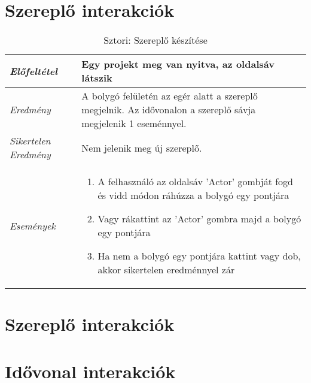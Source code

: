 \section{Szereplő interakciók}

\begin{table}[H]
	\centering
	\begin{tabular}{ | m{} | m{} | }
		\hline
		\emph{Előfeltétel} & Egy projekt meg van nyitva, az oldalsáv látszik  \\
		\hline
		\emph{Eredmény} & A bolygó felületén az egér alatt a szereplő megjelnik. Az idővonalon a szereplő sávja megjelenik 1 eseménnyel.   \\
		\emph{Sikertelen Eredmény} & Nem jelenik meg új szereplő.  \\
		\hline
		\hline
		\emph{Események} &

		\begin{enumerate}
			\item A felhasználó az oldalsáv 'Actor' gombját fogd és vidd módon ráhúzza a bolygó egy pontjára
			\item Vagy rákattint az 'Actor' gombra majd a bolygó egy pontjára
			\item Ha nem a bolygó egy pontjára kattint vagy dob, akkor sikertelen eredménnyel zár
		\end{enumerate}

		\\
		\hline
	\end{tabular}
	\caption{Sztori: Szereplő készítése}
	\label{tab:story-actor-create}
\end{table}


\section{Szereplő interakciók}

\section{Idővonal interakciók}
